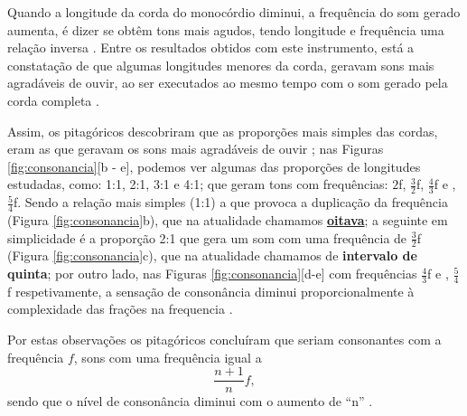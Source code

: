Quando a longitude da corda do monocórdio diminui, 
a frequência do som gerado aumenta, é dizer se obtêm tons mais agudos,
tendo longitude e frequência uma relação inversa \cite[pp. 12]{arbones2012armonia}. 
Entre os resultados obtidos com este instrumento, 
está a constatação de que algumas longitudes menores da corda, 
geravam sons mais agradáveis de ouvir, ao ser executados ao mesmo tempo com o som gerado pela corda completa \cite[pp. 12]{arbones2012armonia}.

Assim, os pitagóricos descobriram que as proporções mais simples das cordas,
eram as que geravam os sons mais agradáveis de ouvir \cite[pp. 12]{arbones2012armonia};
nas Figuras \ref{fig:consonancia}[b - e], podemos ver algumas das proporções de longitudes estudadas,
como: 1:1, 2:1, 3:1 e 4:1; que geram tons com frequências: 
$2$f, $\frac{3}{2}$f, $\frac{4}{3}$f e , $\frac{5}{4}$f.
Sendo a relação mais simples (1:1) a que provoca a duplicação da frequência (Figura \ref{fig:consonancia}b),
que na atualidade chamamos \hyperref[sec:pos:Oitava]{\textbf{oitava}}; 
a seguinte em simplicidade é a proporção 2:1 que gera um som com uma frequência de $\frac{3}{2}$f (Figura \ref{fig:consonancia}c),
que na atualidade chamamos de \textbf{intervalo de quinta};
por outro lado, nas Figuras \ref{fig:consonancia}[d-e] com frequências $\frac{4}{3}$f e , $\frac{5}{4}$f respetivamente,
a sensação de consonância diminui proporcionalmente à complexidade das frações na frequencia \cite[pp. 12]{arbones2012armonia}.

Por estas observações os pitagóricos concluíram que seriam consonantes com a frequência $f$, sons com uma frequência igual a 
\begin{equation}
\label{eq:simplespita}
\frac{n+1}{n}f,
\end{equation}
sendo que o nível de consonância diminui com o aumento de ``n'' \cite[pp. 14]{arbones2012armonia}.

\label{ref:paginadiatonicanumerica}

